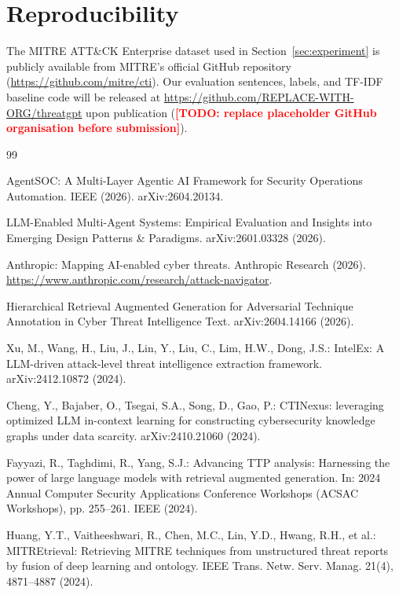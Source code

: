 \documentclass[runningheads]{llncs}
\newcommand{\todo}[1]{\textcolor{red}{\textbf{[TODO: #1]}}}
\begin{document}
\section*{Reproducibility}
The MITRE ATT\&CK Enterprise dataset used in Section~\ref{sec:experiment} is publicly available from MITRE's official GitHub repository (\url{https://github.com/mitre/cti}). Our evaluation sentences, labels, and TF-IDF baseline code will be released at \url{https://github.com/REPLACE-WITH-ORG/threatgpt} upon publication (\todo{replace placeholder GitHub organisation before submission}).


\begin{thebibliography}{99}

 AgentSOC: A Multi-Layer Agentic AI Framework for Security Operations Automation. IEEE (2026). arXiv:2604.20134.

 LLM-Enabled Multi-Agent Systems: Empirical Evaluation and Insights into Emerging Design Patterns \& Paradigms. arXiv:2601.03328 (2026).

 Anthropic: Mapping AI-enabled cyber threats. Anthropic Research (2026). \url{https://www.anthropic.com/research/attack-navigator}.

 Hierarchical Retrieval Augmented Generation for Adversarial Technique Annotation in Cyber Threat Intelligence Text. arXiv:2604.14166 (2026).

 Xu, M., Wang, H., Liu, J., Lin, Y., Liu, C., Lim, H.W., Dong, J.S.: IntelEx: A LLM-driven attack-level threat intelligence extraction framework. arXiv:2412.10872 (2024).

 Cheng, Y., Bajaber, O., Tsegai, S.A., Song, D., Gao, P.: CTINexus: leveraging optimized LLM in-context learning for constructing cybersecurity knowledge graphs under data scarcity. arXiv:2410.21060 (2024).

 Fayyazi, R., Taghdimi, R., Yang, S.J.: Advancing TTP analysis: Harnessing the power of large language models with retrieval augmented generation. In: 2024 Annual Computer Security Applications Conference Workshops (ACSAC Workshops), pp. 255--261. IEEE (2024).

 Huang, Y.T., Vaitheeshwari, R., Chen, M.C., Lin, Y.D., Hwang, R.H., et al.: MITREtrieval: Retrieving MITRE techniques from unstructured threat reports by fusion of deep learning and ontology. IEEE Trans. Netw. Serv. Manag. 21(4), 4871--4887 (2024).


\end{thebibliography}
\end{document}
